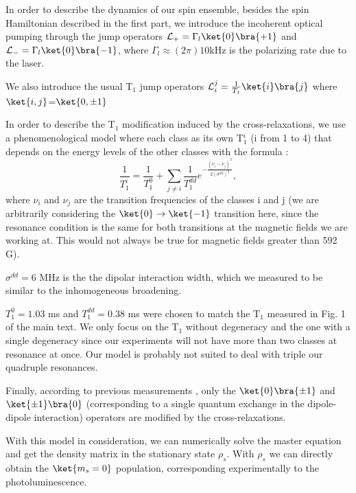 \documentclass[preprintnumbers,amsmath,amssymb,onecolumn,12pt]{revtex4}
\begin{document}
In order to describe the dynamics of our spin ensemble, besides the spin Hamiltonian described in the first part, we introduce the incoherent optical pumping through the jump operators $\mathcal{L}_+ = \Gamma_l \ket{0}\bra{+1} $ and $\mathcal{L}_- = \Gamma_l \ket{0}\bra{-1} $, where $\Gamma_l \approx (2\pi) 10$kHz is the polarizing rate due to the laser.

We also introduce the usual T$_1$ jump operators $\mathcal{L}_i^j= \frac{1}{T_1}\ket{i}\bra{j}$ where $\ket{i,j}$=$\ket{0, \pm 1}$

In order to describe the T$_1$ modification induced by the cross-relaxations, we use a phenomenological model where each class as its own T$_1^i$ (i from 1 to 4) that depends on the energy levels of the other classes with the formula :
\begin{equation*}
\frac{1}{T_1^i}=\frac{1}{T_1^0}+\sum_{j \neq i} \frac{1}{T_1^{dd}}e^{-\frac{(\nu_i-\nu_j)^2}{2(\sigma^{dd})^2}},
\end{equation*}
where $\nu_i$ and $\nu_j$ are the transition frequencies of the classes i and j (we are arbitrarily considering the $\ket{0} \to \ket{-1}$ transition here, since the resonance condition is the same for both transitions at the magnetic fields we are working at. This would not always be true for magnetic fields greater than 592 G\citep{van_oort_cross-relaxation_1989}). 

$\sigma^{dd} = 6$ MHz is the the dipolar interaction width, which we measured to be similar to the inhomogeneous broadening.

$T_1^0=1.03$ ms and $T_1^{dd}=0.38$ ms were chosen to match the T$_1$ measured in Fig. 1 of the main text. We only focus on the T$_1$ without degeneracy and the one with a single degeneracy since our experiments will not have more than two classes at resonance at once. Our model is probably not suited to deal with triple our quadruple resonances.

Finally, according to previous measurements \citep{choi_depolarization_2017}, only the $\ket{0}\bra{\pm1}$ and $\ket{\pm1}\bra{0}$ (corresponding to a single quantum exchange in the dipole-dipole interaction) operators are modified by the cross-relaxations.

With this model in consideration, we can numerically solve the master equation and get the density matrix in the stationary state $\rho_s$. With $\rho_s$ we can directly obtain the $\ket{m_s=0}$ population, corresponding experimentally to the photoluminescence.
\end{document}
